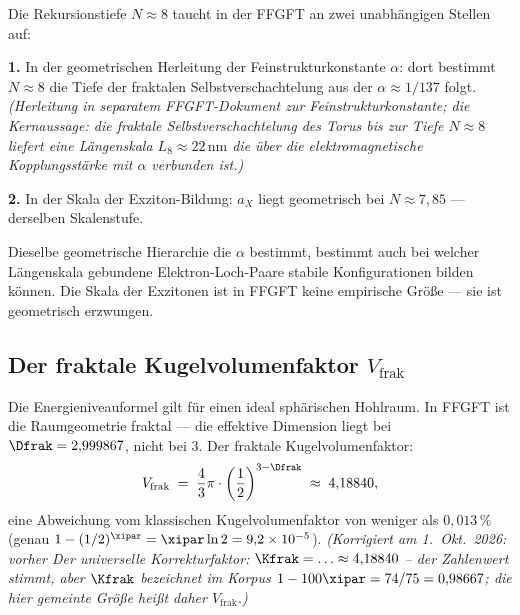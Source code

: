 \begin{foundation}
Die Rekursionstiefe $N \approx 8$ taucht in der FFGFT
an zwei unabhängigen Stellen auf:

\textbf{1.} In der geometrischen Herleitung der Feinstrukturkonstante $\alpha$:
dort bestimmt $N \approx 8$ die Tiefe der fraktalen Selbstverschachtelung
aus der $\alpha \approx 1/137$ folgt.
\emph{(Herleitung in separatem FFGFT-Dokument zur Feinstrukturkonstante;
die Kernaussage: die fraktale Selbstverschachtelung des Torus
bis zur Tiefe $N \approx 8$ liefert eine Längenskala $L_8 \approx 22\,\text{nm}$
die über die elektromagnetische Kopplungsstärke mit $\alpha$ verbunden ist.)}

\textbf{2.} In der Skala der Exziton-Bildung: $a_X$ liegt geometrisch
bei $N \approx 7{,}85$ --- derselben Skalenstufe.

Dieselbe geometrische Hierarchie die $\alpha$ bestimmt,
bestimmt auch bei welcher Längenskala gebundene
Elektron-Loch-Paare stabile Konfigurationen bilden können.
Die Skala der Exzitonen ist in FFGFT keine empirische Größe ---
sie ist geometrisch erzwungen.
\end{foundation}

\subsection{Der fraktale Kugelvolumenfaktor \texorpdfstring{$V_{\text{frak}}$}{V\_frak}}
\label{sec:kfrak}

Die Energieniveauformel gilt für einen ideal sphärischen Hohlraum.
In FFGFT ist die Raumgeometrie fraktal --- die effektive Dimension
liegt bei $\Dfrak = 2{,}999867$, nicht bei 3.
Der fraktale Kugelvolumenfaktor:
\begin{equation}
  V_{\text{frak}} \;=\; \frac{4}{3}\pi \cdot
  \left(\frac{1}{2}\right)^{3 - \Dfrak}
  \;\approx\; 4{,}18840,
\end{equation}
eine Abweichung vom klassischen Kugelvolumenfaktor von weniger
als $0{,}013\,\%$ (genau $1 - (1/2)^{\xipar} = \xipar\ln 2 = 9{,}2 \times 10^{-5}$). \textit{(Korrigiert am 1.~Okt.~2026: vorher \glqq Der universelle Korrekturfaktor: $\Kfrak = \ldots \approx 4{,}18840$\grqq{} -- der Zahlenwert stimmt, aber $\Kfrak$ bezeichnet im Korpus $1 - 100\xipar = 74/75 = 0{,}98667$; die hier gemeinte Größe heißt daher $V_{\text{frak}}$.)}

